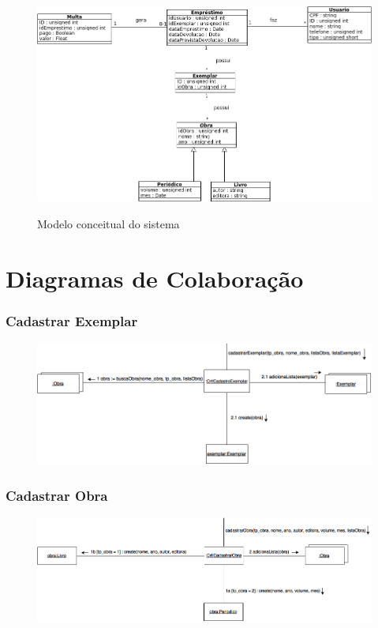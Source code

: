 \documentclass[
	12pt,				%
	openright,			%
	oneside,			%
	a4paper,			%
	english,			%
	brazil				%
	]{abntex2}
\begin{document}
\begin{figure}[H]
\includegraphics[width=1\textwidth]{modeloConceitual}
\label{fig:figura9}
\caption{\small Modelo conceitual do sistema}
\end{figure}

\chapter{Diagramas de Colaboração}

\subsection{Cadastrar Exemplar}

\begin{figure}[H]
\includegraphics[width=1\textwidth]{CadastrarExemplar}
\label{fig:figura2}
\end{figure}

\subsection{Cadastrar Obra}

\begin{figure}[H]
\includegraphics[width=1\textwidth]{CadastrarObra}
\label{fig:figura3}
\end{figure}
\end{document}
